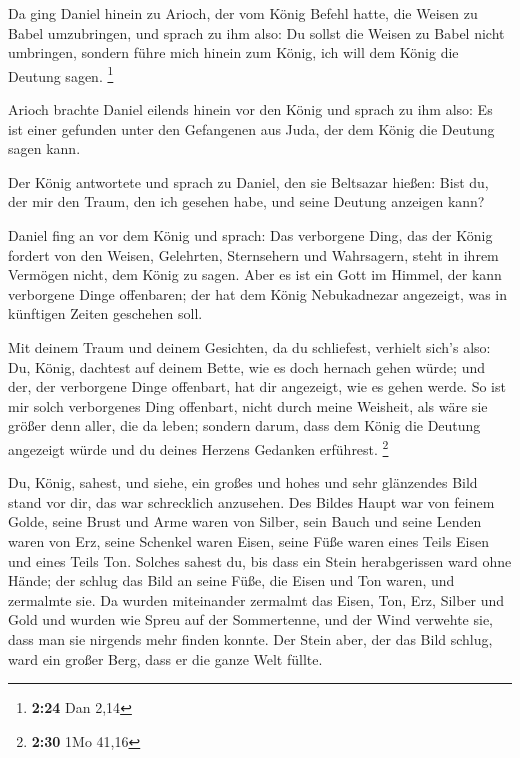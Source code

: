  Da ging Daniel hinein zu Arioch, der vom König Befehl
hatte, die Weisen zu Babel umzubringen, und sprach zu ihm also: Du
sollst die Weisen zu Babel nicht umbringen, sondern führe mich hinein
zum König, ich will dem König die Deutung sagen. \footnote{\textbf{2:24}
  Dan 2,14}

 Arioch brachte Daniel eilends hinein vor den König und
sprach zu ihm also: Es ist einer gefunden unter den Gefangenen aus Juda,
der dem König die Deutung sagen kann.

 Der König antwortete und sprach zu Daniel, den sie
Beltsazar hießen: Bist du, der mir den Traum, den ich gesehen habe, und
seine Deutung anzeigen kann?

 Daniel fing an vor dem König und sprach: Das verborgene
Ding, das der König fordert von den Weisen, Gelehrten, Sternsehern und
Wahrsagern, steht in ihrem Vermögen nicht, dem König zu sagen.
 Aber es ist ein Gott im Himmel, der kann verborgene
Dinge offenbaren; der hat dem König Nebukadnezar angezeigt, was in
künftigen Zeiten geschehen soll.

 Mit deinem Traum und deinem Gesichten, da du schliefest,
verhielt sich's also: Du, König, dachtest auf deinem Bette, wie es doch
hernach gehen würde; und der, der verborgene Dinge offenbart, hat dir
angezeigt, wie es gehen werde.  So ist mir solch
verborgenes Ding offenbart, nicht durch meine Weisheit, als wäre sie
größer denn aller, die da leben; sondern darum, dass dem König die
Deutung angezeigt würde und du deines Herzens Gedanken erführest.
\footnote{\textbf{2:30} 1Mo 41,16}

 Du, König, sahest, und siehe, ein großes und hohes und
sehr glänzendes Bild stand vor dir, das war schrecklich anzusehen.
 Des Bildes Haupt war von feinem Golde, seine Brust und
Arme waren von Silber, sein Bauch und seine Lenden waren von Erz,
 seine Schenkel waren Eisen, seine Füße waren eines Teils
Eisen und eines Teils Ton.  Solches sahest du, bis dass
ein Stein herabgerissen ward ohne Hände; der schlug das Bild an seine
Füße, die Eisen und Ton waren, und zermalmte sie.  Da
wurden miteinander zermalmt das Eisen, Ton, Erz, Silber und Gold und
wurden wie Spreu auf der Sommertenne, und der Wind verwehte sie, dass
man sie nirgends mehr finden konnte. Der Stein aber, der das Bild
schlug, ward ein großer Berg, dass er die ganze Welt füllte.

